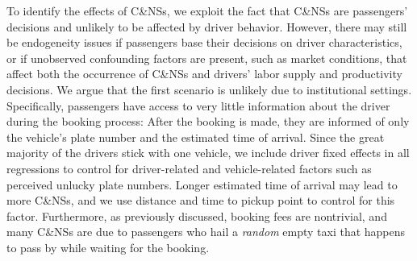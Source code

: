 \documentclass[reviewmode]{AEA}
\begin{document}
To identify the effects of C\&NSs, we exploit the fact that C\&NSs are passengers' decisions and unlikely to be affected by driver behavior. However, there may still be endogeneity issues if passengers base their decisions on driver characteristics, or if unobserved confounding factors are present, such as market conditions, that affect both the occurrence of C\&NSs and drivers' labor supply and productivity decisions. We argue that the first scenario is unlikely due to institutional settings. Specifically, passengers have access to very little information about the driver during the booking process: After the booking is made, they are informed of only the vehicle's plate number and the estimated time of arrival. Since the great majority of the drivers stick with one vehicle, we include driver fixed effects in all regressions to control for driver-related and vehicle-related factors such as perceived unlucky plate numbers. Longer estimated time of arrival may lead to more C\&NSs, and we use distance and time to pickup point to control for this factor. 
Furthermore, as previously discussed, booking fees are nontrivial, and many C\&NSs are due to passengers who hail a \emph{random} empty taxi that happens to pass by while waiting for the booking. 
\end{document}
